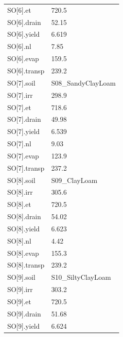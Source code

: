 {\begin{longtable}{p{}p{}}
{}SO[6].et & 720.5\\
{}SO[6].drain & 52.15\\
{}SO[6].yield & 6.619\\
{}SO[6].nl & 7.85\\
{}SO[6].evap & 159.5\\
{}SO[6].transp & 239.2\\
{}SO[7].soil & S08\_SandyClayLoam\\
{}SO[7].irr & 298.9\\
{}SO[7].et & 718.6\\
{}SO[7].drain & 49.98\\
{}SO[7].yield & 6.539\\
{}SO[7].nl & 9.03\\
{}SO[7].evap & 123.9\\
{}SO[7].transp & 237.2\\
{}SO[8].soil & S09\_ClayLoam\\
{}SO[8].irr & 305.6\\
{}SO[8].et & 720.5\\
{}SO[8].drain & 54.02\\
{}SO[8].yield & 6.623\\
{}SO[8].nl & 4.42\\
{}SO[8].evap & 155.3\\
{}SO[8].transp & 239.2\\
{}SO[9].soil & S10\_SiltyClayLoam\\
{}SO[9].irr & 303.2\\
{}SO[9].et & 720.5\\
{}SO[9].drain & 51.68\\
{}SO[9].yield & 6.624\\
\bottomrule\end{longtable}}

